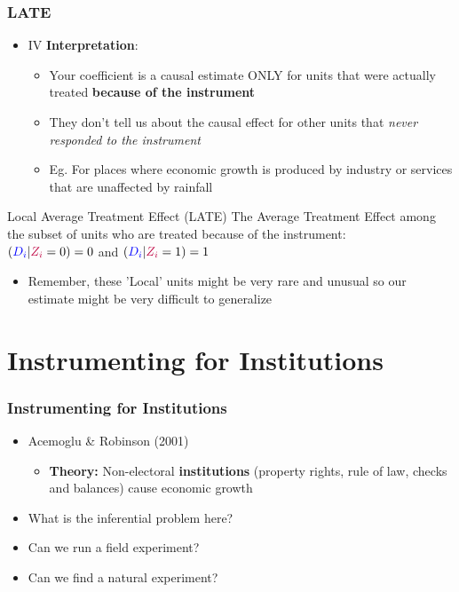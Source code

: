 \documentclass[xcolor=x11names,compress]{beamer}\usepackage[]{graphicx}\usepackage[]{color}
\renewcommand{\(}{\begin{columns}}
\renewcommand{\)}{\end{columns}}
\newcommand{\<}[1]{\begin{column}{#1}}
\renewcommand{\>}{\end{column}}
\begin{document}
\begin{frame}
\frametitle{LATE}
\begin{itemize}
\item IV \textbf{Interpretation}:
\pause
\begin{itemize}
\item Your coefficient is a causal estimate ONLY for units that were actually treated \textbf{because of the instrument}
\pause
\item They don't tell us about the causal effect for other units that \textit{never responded to the instrument}
\pause
\item Eg. For places where economic growth is produced by industry or services that are unaffected by rainfall
\end{itemize}
\end{itemize}
\pause
\begin{block}{Local Average Treatment Effect (LATE)}
The Average Treatment Effect among the subset of units who are treated because of the instrument: \\
$(\textcolor{blue}{D_i}|\textcolor{purple}{Z_i}=0) = 0$ and $(\textcolor{blue}{D_i}|\textcolor{purple}{Z_i}=1) = 1$
\end{block}
\begin{itemize}
\pause
\item Remember, these 'Local' units might be very rare and unusual so our estimate might be very difficult to generalize
\end{itemize}
\end{frame}

\section{Instrumenting for Institutions}

\begin{frame}
\frametitle{Instrumenting for Institutions}
\begin{itemize}
\item Acemoglu \& Robinson (2001)
\begin{itemize}
\item \textbf{Theory:} Non-electoral \textbf{institutions} (property rights, rule of law, checks and balances) cause economic growth
\pause
\end{itemize}
\item What is the inferential problem here?
\pause
\item Can we run a field experiment?
\pause
\item Can we find a natural experiment?
\end{itemize}
\end{frame}
\end{document}

